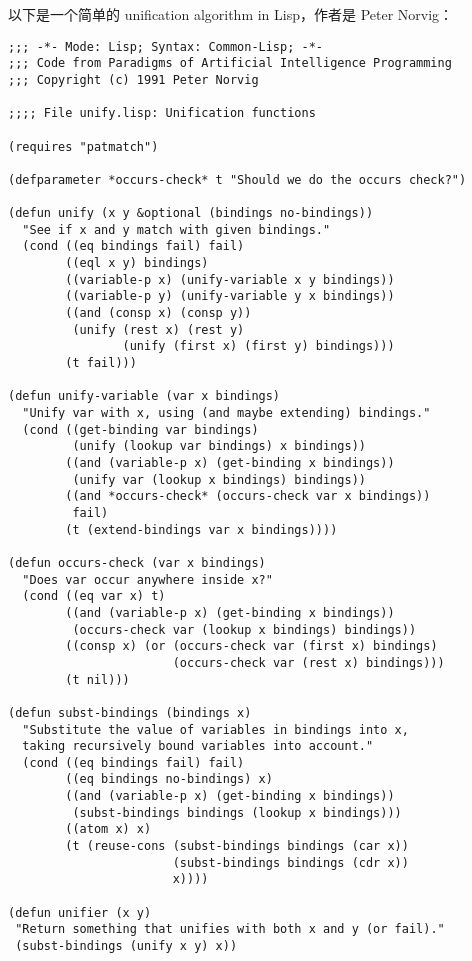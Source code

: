 \documentclass[12pt, orivec]{article}
\begin{document}
以下是一个简单的 unification algorithm in Lisp，作者是 Peter Norvig： 
\begin{tcolorbox}[breakable]
\footnotesize
\ttfamily
\begin{verbatim}
;;; -*- Mode: Lisp; Syntax: Common-Lisp; -*-
;;; Code from Paradigms of Artificial Intelligence Programming
;;; Copyright (c) 1991 Peter Norvig

;;;; File unify.lisp: Unification functions

(requires "patmatch")

(defparameter *occurs-check* t "Should we do the occurs check?")

(defun unify (x y &optional (bindings no-bindings))
  "See if x and y match with given bindings."
  (cond ((eq bindings fail) fail)
        ((eql x y) bindings)
        ((variable-p x) (unify-variable x y bindings))
        ((variable-p y) (unify-variable y x bindings))
        ((and (consp x) (consp y))
         (unify (rest x) (rest y) 
                (unify (first x) (first y) bindings)))
        (t fail)))

(defun unify-variable (var x bindings)
  "Unify var with x, using (and maybe extending) bindings."
  (cond ((get-binding var bindings)
         (unify (lookup var bindings) x bindings))
        ((and (variable-p x) (get-binding x bindings))
         (unify var (lookup x bindings) bindings))
        ((and *occurs-check* (occurs-check var x bindings))
         fail)
        (t (extend-bindings var x bindings))))

(defun occurs-check (var x bindings)
  "Does var occur anywhere inside x?"
  (cond ((eq var x) t)
        ((and (variable-p x) (get-binding x bindings))
         (occurs-check var (lookup x bindings) bindings))
        ((consp x) (or (occurs-check var (first x) bindings)
                       (occurs-check var (rest x) bindings)))
        (t nil)))

(defun subst-bindings (bindings x)
  "Substitute the value of variables in bindings into x,
  taking recursively bound variables into account."
  (cond ((eq bindings fail) fail)
        ((eq bindings no-bindings) x)
        ((and (variable-p x) (get-binding x bindings))
         (subst-bindings bindings (lookup x bindings)))
        ((atom x) x)
        (t (reuse-cons (subst-bindings bindings (car x))
                       (subst-bindings bindings (cdr x))
                       x))))

(defun unifier (x y)
 "Return something that unifies with both x and y (or fail)."
 (subst-bindings (unify x y) x))
\end{verbatim}
\normalsize
\rmfamily
\end{tcolorbox}
\end{document}
